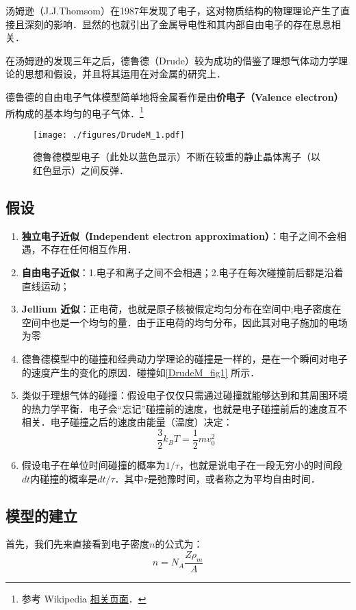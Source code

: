 
\begin{issues}
\issueDraft
\end{issues}

汤姆逊（J.J.Thomsom）在1987年发现了电子，这对物质结构的物理理论产生了直接且深刻的影响．显然的也就引出了金属导电性和其内部自由电子的存在息息相关．

在汤姆逊的发现三年之后，德鲁德（Drude）较为成功的借鉴了理想气体动力学理论的思想和假设，并且将其运用在对金属的研究上．

德鲁德的自由电子气体模型简单地将金属看作是由\textbf{价电子（Valence electron）}所构成的基本均匀的电子气体．\footnote{参考 Wikipedia \href{https://en.wikipedia.org/wiki/Drude_model}{相关页面}．}
\begin{figure}[ht]
\centering
\texttt{[image: ./figures/DrudeM\_1.pdf]}
\caption{德鲁德模型电子（此处以蓝色显示）不断在较重的静止晶体离子（以红色显示）之间反弹．} \label{DrudeM_fig1}
\end{figure}
\subsection{假设}
\begin{enumerate}
\item \textbf{独立电子近似（Independent electron approximation）}：电子之间不会相遇，不存在任何相互作用．
\item \textbf{自由电子近似}：1.电子和离子之间不会相遇；2.电子在每次碰撞前后都是沿着直线运动；
\item \textbf{Jellium 近似}：正电荷，也就是原子核被假定均匀分布在空间中;电子密度在空间中也是一个均匀的量．由于正电荷的均匀分布，因此其对电子施加的电场为零
\item 德鲁德模型中的碰撞和经典动力学理论的碰撞是一样的，是在一个瞬间对电子的速度产生的变化的原因．碰撞如\autoref{DrudeM_fig1} 所示．
\item 类似于理想气体的碰撞：假设电子仅仅只需通过碰撞就能够达到和其周围环境的热力学平衡．电子会“忘记”碰撞前的速度，也就是电子碰撞前后的速度互不相关．电子碰撞之后的速度由能量（温度）决定：
\begin{equation}
\frac{3}{2}k_BT = \frac{1}{2}mv_0^2
\end{equation}
\item 假设电子在单位时间碰撞的概率为$1/\tau $，也就是说电子在一段无穷小的时间段$dt$内碰撞的概率是$dt/\tau$．其中$\tau$是弛豫时间，或者称之为平均自由时间．
\end{enumerate}
\subsection{模型的建立}
首先，我们先来直接看到电子密度$n$的公式为：
\begin{equation}
n=N_A\frac{Z\rho_m}{A}
\end{equation}


